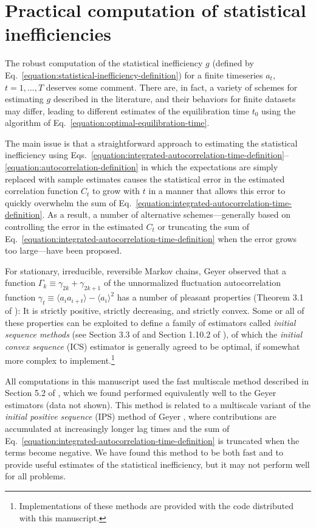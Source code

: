 \documentclass[aps,pre,twocolumn,nofootinbib,superscriptaddress,linenumbers,11point]{revtex4-1}
\newcommand{\expect}[1]{\langle #1 \rangle}                %
\begin{document}
\section*{Practical computation of statistical inefficiencies}

The robust computation of the statistical inefficiency $g$ (defined by Eq.~\ref{equation:statistical-inefficiency-definition}) for a finite timeseries $a_t$, $t = 1, \ldots, T$ deserves some comment.
There are, in fact, a variety of schemes for estimating $g$ described in the literature, and their behaviors for finite datasets may differ, leading to different estimates of the equilibration time $t_0$ using the algorithm of Eq.~\ref{equation:optimal-equilibration-time}.

The main issue is that a straightforward approach to estimating the statistical inefficiency using Eqs.~\ref{equation:integrated-autocorrelation-time-definition}--\ref{equation:autocorrelation-definition} in which the expectations are simply replaced with sample estimates causes the statistical error in the estimated correlation function $C_t$ to grow with $t$ in a manner that allows this error to quickly overwhelm the sum of Eq.~\ref{equation:integrated-autocorrelation-time-definition}.
As a result, a number of alternative schemes---generally based on controlling the error in the estimated $C_t$ or truncating the sum of Eq.~\ref{equation:integrated-autocorrelation-time-definition} when the error grows too large---have been proposed.

For stationary, irreducible, reversible Markov chains, Geyer observed that a function $\Gamma_{k} \equiv \gamma_{2k} + \gamma_{2k+1}$ of the unnormalized fluctuation autocorrelation function $\gamma_t \equiv \expect{a_i a_{i+t}} - \expect{a_i}^2$ has a number of pleasant properties (Theorem 3.1 of \cite{geyer:1992:stat-sci:practical-mcmc}): It is strictly positive, strictly decreasing, and strictly convex.
Some or all of these properties can be exploited to define a family of estimators called \emph{initial sequence methods} (see Section 3.3 of \cite{geyer:1992:stat-sci:practical-mcmc} and Section 1.10.2 of \cite{crc-mcmc-handbook}), of which the \emph{initial convex sequence} (ICS) estimator is generally agreed to be optimal, if somewhat more complex to implement.\footnote{Implementations of these methods are provided with the code distributed with this manuscript.}

All computations in this manuscript used the fast multiscale method described in Section 5.2 of \citep{chodera:jctc:2007:wham}, which we found performed equivalently well to the Geyer estimators (data not shown).
This method is related to a multiscale variant of the \emph{initial positive sequence} (IPS) method of Geyer \cite{geyer-thompson:j-royal-stat-soc-b:1992:initial-sequence-estimators}, where contributions are accumulated at increasingly longer lag times and the sum of Eq.~\ref{equation:integrated-autocorrelation-time-definition} is truncated when the terms become negative.
We have found this method to be both fast and to provide useful estimates of the statistical inefficiency, but it may not perform well for all problems.
\end{document}
